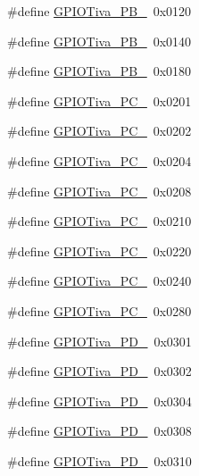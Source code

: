 \begin{DoxyCompactItemize}
\#define \hyperlink{_g_p_i_o_tiva_8h_a93baea11c6d1ba704e9042d49e0f0edb}{G\+P\+I\+O\+Tiva\+\_\+\+P\+B\+\_}~0x0120
\item 
\#define \hyperlink{_g_p_i_o_tiva_8h_a0df4c37061c339b6bf59ae6ed5fa3760}{G\+P\+I\+O\+Tiva\+\_\+\+P\+B\+\_}~0x0140
\item 
\#define \hyperlink{_g_p_i_o_tiva_8h_afff3080fe81e9a35ef3df9c19c8d4b89}{G\+P\+I\+O\+Tiva\+\_\+\+P\+B\+\_}~0x0180
\item 
\#define \hyperlink{_g_p_i_o_tiva_8h_af0657a222601361721fb5e23291ed6c4}{G\+P\+I\+O\+Tiva\+\_\+\+P\+C\+\_}~0x0201
\item 
\#define \hyperlink{_g_p_i_o_tiva_8h_acc9e981104133cfbbd3892bc55b802b0}{G\+P\+I\+O\+Tiva\+\_\+\+P\+C\+\_}~0x0202
\item 
\#define \hyperlink{_g_p_i_o_tiva_8h_aa6ee716e3aea2baa51ca2a4231e06b11}{G\+P\+I\+O\+Tiva\+\_\+\+P\+C\+\_}~0x0204
\item 
\#define \hyperlink{_g_p_i_o_tiva_8h_a248401f1ffb1738db40210329170ff58}{G\+P\+I\+O\+Tiva\+\_\+\+P\+C\+\_}~0x0208
\item 
\#define \hyperlink{_g_p_i_o_tiva_8h_a63612ec53f3127a557ac1903633246ab}{G\+P\+I\+O\+Tiva\+\_\+\+P\+C\+\_}~0x0210
\item 
\#define \hyperlink{_g_p_i_o_tiva_8h_a24897321cace62ade53651572500e895}{G\+P\+I\+O\+Tiva\+\_\+\+P\+C\+\_}~0x0220
\item 
\#define \hyperlink{_g_p_i_o_tiva_8h_a28451909c9a84caf34eb581f17502b35}{G\+P\+I\+O\+Tiva\+\_\+\+P\+C\+\_}~0x0240
\item 
\#define \hyperlink{_g_p_i_o_tiva_8h_acc40063ddcddcca50af55ad1b808caf5}{G\+P\+I\+O\+Tiva\+\_\+\+P\+C\+\_}~0x0280
\item 
\#define \hyperlink{_g_p_i_o_tiva_8h_a29ae5b77d5cccf31ca0ec51f7f6187ce}{G\+P\+I\+O\+Tiva\+\_\+\+P\+D\+\_}~0x0301
\item 
\#define \hyperlink{_g_p_i_o_tiva_8h_a35ee673b973e7754de6f19a86e93ed27}{G\+P\+I\+O\+Tiva\+\_\+\+P\+D\+\_}~0x0302
\item 
\#define \hyperlink{_g_p_i_o_tiva_8h_a65e3482d94876b3f872383bb1c431f87}{G\+P\+I\+O\+Tiva\+\_\+\+P\+D\+\_}~0x0304
\item 
\#define \hyperlink{_g_p_i_o_tiva_8h_ac18c03e7bcf149788c7fb53548a8c21a}{G\+P\+I\+O\+Tiva\+\_\+\+P\+D\+\_}~0x0308
\item 
\#define \hyperlink{_g_p_i_o_tiva_8h_abffef22c58070fb6feeef7359a31754a}{G\+P\+I\+O\+Tiva\+\_\+\+P\+D\+\_}~0x0310
\item 

\end{DoxyCompactItemize}
